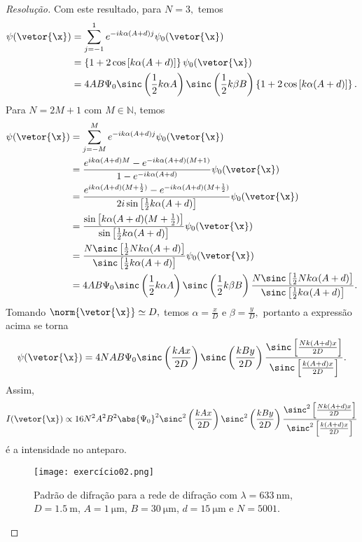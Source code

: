\begin{proof}[Resolução]
    Com este resultado, para \(N = 3,\) temos
    \begin{align*}
        \psi(\vetor{\x}) &= \sum_{j = -1}^1 e^{-ik \alpha(A + d)j} \psi_0(\vetor{\x})\\
                         &= \left\{1 + 2\cos\left[k\alpha(A + d)\right]\right\} \psi_0(\vetor{\x})\\
                         &= 4 AB \Psi_0 \sinc\left(\frac12 k \alpha A\right)\sinc\left(\frac12 k \beta B\right) \left\{1 + 2\cos\left[k\alpha(A + d)\right]\right\}.
    \end{align*}
    Para \(N = 2M + 1\) com \(M \in \mathbb{N}\), temos
    \begin{align*}
        \psi(\vetor{\x}) &= \sum_{j = -M}^M e^{-ik \alpha(A + d)j} \psi_0(\vetor{\x})\\
                         &= \frac{e^{ik \alpha (A + d)M} - e^{-ik \alpha(A + d)(M+1)}}{1 - e^{-ik \alpha (A + d)}}\psi_0(\vetor{\x})\\
                         &= \frac{e^{ik \alpha (A + d) (M + \frac12)} - e^{-ik \alpha (A + d) (M + \frac12)}}{2i\sin\left[\frac12 k \alpha(A + d)\right]}\psi_0(\vetor{\x})\\
                         &= \frac{\sin\left[k \alpha (A + d) (M + \frac12)\right]}{\sin\left[\frac12 k \alpha (A + d)\right]} \psi_0(\vetor{\x})\\
                         &= \frac{N\sinc\left[\frac12 N k \alpha (A + d)\right]}{\sinc\left[\frac12 k \alpha (A + d)\right]} \psi_0(\vetor{\x})\\
                         &= 4AB \Psi_0 \sinc\left(\frac12 k \alpha A\right) \sinc\left(\frac12 k \beta B\right)\frac{N\sinc\left[\frac12 N k \alpha (A + d)\right]}{\sinc\left[\frac12 k \alpha (A + d)\right]}.
    \end{align*}
    Tomando \(\norm{\vetor{\x}} \simeq D,\) temos \(\alpha = \frac{x}{D}\) e \(\beta = \frac{y}{D},\) portanto a expressão acima se torna
    \begin{equation*}
        \psi(\vetor{\x}) = 4NAB \Psi_0 \sinc\left(\frac{k A x}{2 D}\right) \sinc\left(\frac{k B y}{2D}\right)\frac{\sinc\left[\frac{N k (A + d) x}{2D}\right]}{\sinc\left[\frac{k (A + d) x}{2D}\right]}.
    \end{equation*}
    Assim,
    \begin{equation*}
        I(\vetor{\x}) \propto 16 N^2 A^2B^2 \abs{\Psi_0}^2 \sinc^2\left(\frac{k A x}{2 D}\right) \sinc^2\left(\frac{k B y}{2D}\right)\frac{\sinc^2\left[\frac{N k (A + d) x}{2D}\right]}{\sinc^2\left[\frac{k (A + d) x}{2D}\right]}
    \end{equation*}
    é a intensidade no anteparo.

    \begin{figure}[h]
        \centering
        \texttt{[image: exercício02.png]}
        \caption{Padrão de difração para a rede de difração com \(\lambda = \SI{633}{\nano\meter}\), \(D = \SI{1.5}{\meter}\), \(A = \SI{1}{\micro\meter}\), \(B = \SI{30}{\micro\meter}\), \(d = \SI{15}{\micro\meter}\) e \(N = 5001.\)}
    \end{figure}
\end{proof}
